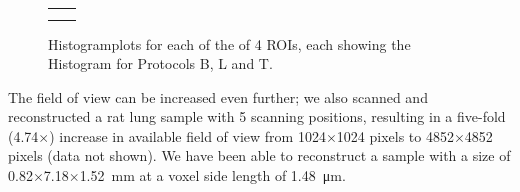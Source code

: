 \begin{figure}%
	\centering
		\begin{tabular}{cc}
			&
			\\
			&
			
		\end{tabular}
	\caption{Histogramplots for each of the of 4 ROIs, each showing the Histogram for Protocols B, L and T.}%
	\label{fig:DTFplots}%
\end{figure}

The field of view can be increased even further; we also scanned and reconstructed a rat lung sample with 5 scanning positions, resulting in a five-fold (4.74$\times$) increase in available field of view from 1024$\times$1024 pixels to 4852$\times$4852 pixels (data not shown). We have been able to reconstruct a sample with a size of 0.82$\times$7.18$\times$\SI{1.52}{\milli\meter} %
at a voxel side length of \SI{1.48}{\micro\meter}.